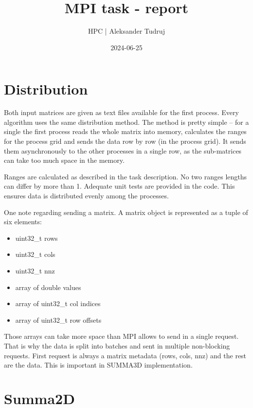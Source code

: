 \documentclass[a4paper,12pt]{article}
\title{ MPI task - report }
\author{ HPC | Aleksander Tudruj }
\date{ 2024-06-25 }
\begin{document}
    \maketitle

    \tableofcontents
    \newpage

    \section{ Distribution }

    Both input matrices are given as text files available for the first process.
    Every algorithm uses the same distribution method.
    The method is pretty simple -- for a single the first process reads
    the whole matrix into memory, calculates the ranges for the process grid
    and sends the data row by row (in the process grid).
    It sends them asynchronously to the other processes in a single row,
    as the sub-matrices can take too much space in the memory.

    Ranges are calculated as described in the task description.
    No two ranges lengths can differ by more than 1.
    Adequate unit tests are provided in the code.
    This ensures data is distributed evenly among the processes.

    One note regarding sending a matrix. A matrix object is represented as a tuple
    of six elements:
    \begin{itemize}
        \item uint32\_t rows
        \item uint32\_t cols
        \item uint32\_t nnz
        \item array of double values
        \item array of uint32\_t col indices
        \item array of uint32\_t row offsets
    \end{itemize}

    Those arrays can take more space than MPI allows to send in a single request.
    That is why the data is split into batches and sent in multiple non-blocking requests.
    First request is always a matrix metadata (rows, cols, nnz) and the rest are the data.
    This is important in SUMMA3D implementation.

    \section{ Summa2D }
\end{document}
